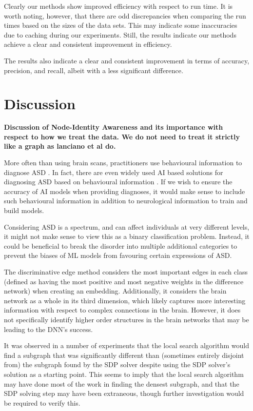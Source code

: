 \documentclass[sigconf]{acmart}
\begin{document}
Clearly our methods show improved efficiency with respect to run time.
It is worth noting, however, that there are odd discrepancies when comparing the run times based on the sizes of the data sets.
This may indicate some inaccuracies due to caching during our experiments.
Still, the results indicate our methods achieve a clear and consistent improvement in efficiency.

The results also indicate a clear and consistent improvement in terms of accuracy, precision, and recall, albeit with a less significant difference.


\section{Discussion}\label{discussion}
\textbf{Discussion of Node-Identity Awareness and its importance with respect to how we treat the data. We do not need to treat it strictly like a graph as lanciano et al do.}

More often than using brain scans, practitioners use behavioural information to diagnose ASD \cite{lord2006, johnson2007, dsm52013}.
In fact, there are even widely used AI based solutions for diagnosing ASD based on behavioural information \cite{knopf2021}.
If we wish to ensure the accuracy of AI models when providing diagnoses, it would make sense to include such behavioural information in addition to neurological information to train and build models.

Considering ASD is a spectrum, and can affect individuals at very different levels, it might not make sense to view this as a binary classification problem.
Instead, it could be beneficial to break the disorder into multiple additional categories to prevent the biases of ML models from favouring certain expressions of ASD.

The discriminative edge method considers the most important edges in each class (defined as having the most positive and most negative weights in the difference network) when creating an embedding.
Additionally, it considers the brain network as a whole in its third dimension, which likely captures more interesting information with respect to complex connections in the brain.
However, it does not specifically identify higher order structures in the brain networks that may be leading to the DNN's success.

It was observed in a number of experiments that the local search algorithm would find a subgraph that was significantly different than (sometimes entirely disjoint from) the subgraph found by the SDP solver despite using the SDP solver's solution as a starting point.
This seems to imply that the local search algorithm may have done most of the work in finding the densest subgraph, and that the SDP solving step may have been extraneous, though further investigation would be required to verify this.
\end{document}
